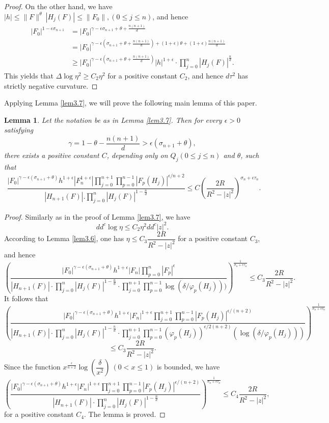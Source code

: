\documentclass[12pt,article]{amsart}
\newtheorem{lemma}[equation]{Lemma}
\numberwithin{equation}{section}
\begin{document}
\begin{proof}
On the other hand, we have $|h|\le \|F\|^{\theta}\ |H_j(F)|\le \|F_0\|,(0\le j\le n)$, and hence
\begin{align*}
|F_{0}|^{1-\epsilon\sigma_{n+1}}&=|F_{0}|^{\gamma-\epsilon\sigma_{n+1}+\theta+\frac{n(n+1)}{d}}\\
&=|F_{0}|^{\gamma-\epsilon(\sigma_{n+1}+\theta+\frac{n(n+1)}{d})+(1+\epsilon)\theta+(1+\epsilon)\frac{n(n+1)}{d}}\\
&\ge |F_{0}|^{\gamma-\epsilon(\sigma_{n+1}+\theta+\frac{n(n+1)}{d})}|h|^{1+\epsilon}\cdot\prod_{j=0}^n|H_j(F)|^{\frac{n}{d}}.
\end{align*}
This yields that $\Delta \log\eta^2\ge C_2\eta^2$ for a positive constant $C_2$, and hence $d\tau^2$ has strictly negative curvature.
\end{proof}

Applying Lemma \ref{lem3.7}, we will prove the following main lemma of this paper.
\begin{lemma}\label{ML}
Let the notation be as in Lemma \ref{lem3.7}. Then for every $\epsilon >0$ satisfying 
$$\gamma=1-\theta-\frac{n(n+1)}{d}>\epsilon\left(\sigma_{n+1}+\theta\right),$$ 
there exists a positive constant $C$, depending only on $ Q_j (0\le j\le n)$ and $\theta$, such that
\begin{align*}
\dfrac{|F_{0}|^{\gamma-\epsilon(\sigma_{n+1}+\theta)}h^{1+\epsilon}|F_n^{1+\epsilon}|\prod_{j=0}^{n+1}\prod_{p=0}^{n-1}|F_{p}(H_j)|^{\epsilon/{n+2}}}{|H_{n+1}(F)|.\prod_{j=0}^{n}|H_j(F)|^{1-\frac{n}{d}}}\le C\left(\dfrac{2R}{R^2-|z|^2}\right)^{\sigma_n+\epsilon\tau_n}.
\end{align*}
\end{lemma}
\begin{proof}
Similarly as in the proof of Lemma \ref{lem3.7}, we have
$$dd^c\log\eta\le C_2\eta^2dd^c|z|^2.$$
According to Lemma \ref{lem3.6}, one has $ \eta\le C_3\dfrac{2R}{R^2-|z|^2}$ for a positive constant $C_3$, and hence
$$ \left( \dfrac{|F_{0}|^{\gamma-\epsilon(\sigma_{n+1}+\theta)}h^{1+\epsilon}|F_n|\prod_{p=0}^{n}|F_{p}|^{\epsilon}}{|H_{n+1}(F)|\cdot\prod_{j=0}^{n}|H_j(F)|^{1-\frac{n}{d}}\cdot\prod_{j=0}^{n+1}\prod_{p=0}^{n-1}\log (\delta/\varphi_{p}(H_j)))}\right )^{\frac{1}{\sigma_n+\epsilon\tau_n}}\le C_3\dfrac{2R}{R^2-|z|^2}.$$
It follows that
$$ \left( \dfrac{|F_{0}|^{\gamma-\epsilon(\sigma_{n+1}+\theta)}h^{1+\epsilon}|F_n|^{1+\epsilon}\prod_{j=0}^{n+1}\prod_{p=0}^{n-1}|F_{p}(H_j)|^{\epsilon/(n+2)}}{|H_{n+1}(F)|\cdot\prod_{j=0}^{n}|H_j(F)|^{1-\frac{n}{d}}\cdot\prod_{j=0}^{n+1}\prod_{p=0}^{n-1}(\varphi_{p}(H_j))^{\epsilon/2(n+2)}(\log (\delta/\varphi_{p}(H_j)))}\right )^{\frac{1}{\sigma_n+\epsilon\tau_n}}$$
$$\le C_3\dfrac{2R}{R^2-|z|^2}.$$
Since the function $x^{\frac{\epsilon}{n+2}}\log\left (\dfrac{\delta}{x^2}\right)\ (0<x\le 1)$ is bounded, we have
$$\left( \dfrac{|F_{0}|^{\gamma-\epsilon(\sigma_{n+1}+\theta)}h^{1+\epsilon}|F_n|^{1+\epsilon}\prod_{j=0}^{n+1}\prod_{p=0}^{n-1}|F_{p}(H_j)|^{\epsilon/(n+2)}}{|H_{n+1}(F)|\cdot\prod_{j=0}^{n}|H_j(F)|^{1-\frac{n}{d}}}\right )^{\frac{1}{\sigma_n+\epsilon\tau_n}}\le C_4\dfrac{2R}{R^2-|z|^2},$$
for a positive constant $C_4$. The lemma is proved.
\end{proof}
\end{document}

